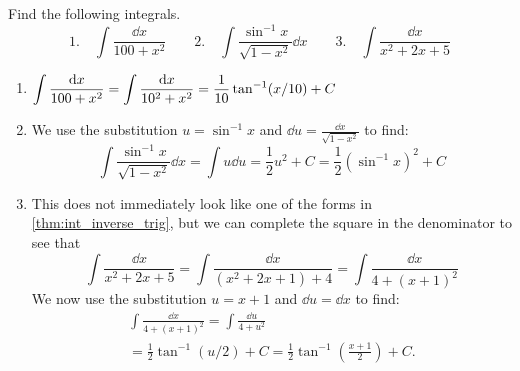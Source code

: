\begin{example}\label{eg_inv_deriv_harder}%
Find the following integrals.
\[
 \text{1.}\quad\int\frac{\dd x}{100+x^2}\qquad
 \text{2.}\quad\int\frac{\sin^{-1} x}{\sqrt{1-x^2}}\dd x\qquad
 \text{3.}\quad\int\frac{\dd x}{x^2+2x+5}
\]
\solution
\begin{enumerate}
\item $\displaystyle\int\frac{\operatorname{d}\! x}{100+x^2}=\int\frac{\operatorname{d}\! x}{10^2+x^2}=\frac1{10}\tan^{-1}(x/10)+C$
\item We use the substitution $u=\sin^{-1}x$ and $\dd u=\frac{\dd x}{\sqrt{1-x^2}}$ to find:
\[\int\frac{\sin^{-1}x}{\sqrt{1-x^2}}\dd x=\int u\dd u=\frac12 u^2+C=\frac 12\left(\sin^{-1}x\right)^2+C\]
\item This does not immediately look like one of the forms in \autoref{thm:int_inverse_trig}, but we can complete the square in the denominator to see that
\[\int\frac{\dd x}{x^2+2x+5} =\int\frac{\dd x}{(x^2+2x+1)+4}=\int\frac{\dd x}{4+(x+1)^2}\]
We now use the substitution $u=x+1$ and $\dd u=\dd x$ to find:
\begin{multline*}
 \int\frac{\dd x}{4+(x+1)^2} =\int\frac{\dd u}{4+u^2}\\
 =\frac12 \tan^{-1}(u/2)+C =\frac 12\tan^{-1}\left(\frac{x+1}2\right)+C.
\end{multline*}
\end{enumerate}
\end{example}

